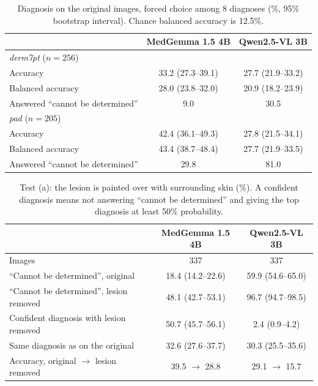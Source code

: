 \begin{table}[H]\centering\small
\caption{Diagnosis on the original images, forced choice among 8 diagnoses (\%, 95\% bootstrap interval). Chance balanced accuracy is 12.5\%.}\label{tab:baseline}
\begin{tabular}{lcc}\toprule
 & MedGemma 1.5 4B & Qwen2.5-VL 3B \\\midrule
\textit{derm7pt} ($n=256$) &  &  \\
\quad Accuracy & 33.2 (27.3--39.1) & 27.7 (21.9--33.2) \\
\quad Balanced accuracy & 28.0 (23.8--32.0) & 20.9 (18.2--23.9) \\
\quad Answered ``cannot be determined'' & 9.0 & 30.5 \\
\textit{pad} ($n=205$) &  &  \\
\quad Accuracy & 42.4 (36.1--49.3) & 27.8 (21.5--34.1) \\
\quad Balanced accuracy & 43.4 (38.7--48.4) & 27.7 (21.9--33.5) \\
\quad Answered ``cannot be determined'' & 29.8 & 81.0 \\
\bottomrule\end{tabular}\end{table}

\begin{table}[H]\centering\small
\caption{Test (a): the lesion is painted over with surrounding skin (\%). A confident diagnosis means not answering ``cannot be determined'' and giving the top diagnosis at least 50\% probability.}\label{tab:removed}
\begin{tabular}{lcc}\toprule
 & MedGemma 1.5 4B & Qwen2.5-VL 3B \\\midrule
Images & 337 & 337 \\
``Cannot be determined'', original & 18.4 (14.2--22.6) & 59.9 (54.6--65.0) \\
``Cannot be determined'', lesion removed & 48.1 (42.7--53.1) & 96.7 (94.7--98.5) \\
Confident diagnosis with lesion removed & 50.7 (45.7--56.1) & 2.4 (0.9--4.2) \\
Same diagnosis as on the original & 32.6 (27.6--37.7) & 30.3 (25.5--35.6) \\
Accuracy, original $\rightarrow$ lesion removed & 39.5 $\rightarrow$ 28.8 & 29.1 $\rightarrow$ 15.7 \\
\bottomrule\end{tabular}\end{table}

